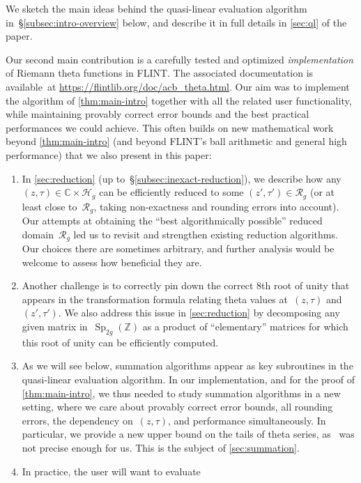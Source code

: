 \documentclass[12pt,oneside]{amsart}
\numberwithin{equation}{section}
\theoremstyle{definition}
\newcommand{\Z}{\mathbb{Z}}
\newcommand{\red}{\mathcal{R}}
\newcommand{\C}{\mathbb{C}}
\newcommand{\Half}{\mathcal{H}}
\DeclareMathOperator{\Sp}{Sp}
\begin{document}
We sketch the main ideas behind the quasi-linear evaluation algorithm
in~§\ref{subsec:intro-overview} below, and describe it in full details in
\cref{sec:ql} of the paper.

Our second main contribution is a carefully tested and optimized
\emph{implementation} of Riemann theta functions in FLINT. The associated
documentation is available~at
\url{https://flintlib.org/doc/acb_theta.html}. Our aim was to implement the
algorithm of \cref{thm:main-intro} together with all the related user
functionality, while maintaining provably correct error bounds and the best
practical performances we could achieve. This often builds on new mathematical
work beyond \cref{thm:main-intro} (and beyond FLINT's ball arithmetic and
general high performance) that we also present in this paper:
\begin{enumerate}
\item \label{item:intro-reduction} In \cref{sec:reduction} (up
  to~§\ref{subsec:inexact-reduction}), we describe how any
  $(z,\tau)\in \C\times \Half_g$ can be efficiently reduced to some
  $(z',\tau')\in \red_g$ (or at least close to~$\red_g$, taking non-exactness
  and rounding errors into account). Our attempts at obtaining the ``best
  algorithmically possible'' reduced domain~$\red_g$ led us to revisit and
  strengthen existing reduction algorithms. Our choices there are sometimes
  arbitrary, and further analysis would be welcome to assess how beneficial
  they are.
\item \label{item:intro-transf} Another challenge is to correctly pin down the
  correct 8th root of unity that appears in the transformation formula relating
  theta values at~$(z,\tau)$ and~$(z',\tau')$. We also address this issue in
  \cref{sec:reduction} by decomposing any given matrix in~$\Sp_{2g}(\Z)$ as a
  product of ``elementary'' matrices for which this root of unity can be
  efficiently computed.
\item As we will see below, summation algorithms appear as key subroutines in
  the quasi-linear evaluation algorithm. In our implementation, and for the
  proof of \cref{thm:main-intro}, we thus needed to study summation algorithms
  in a new setting, where we care about provably correct error bounds, all
  rounding errors, the dependency on~$(z,\tau)$, and performance
  simultaneously. In particular, we provide a new upper bound on the tails of
  theta series, as~\cite[Lemma 2]{deconinckComputingRiemannTheta2004} was not
  precise enough for us. This is the subject of \cref{sec:summation}.
\item \label{item:intro-inexact} In practice, the user will want to evaluate

\end{enumerate}
\end{document}
